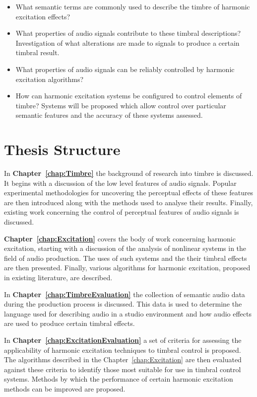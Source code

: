 	\begin{itemize}
		\item What semantic terms are commonly used to describe the timbre of harmonic excitation effects? 
		\item What properties of audio signals contribute to these timbral descriptions? Investigation of what
		      alterations are made to signals to produce a certain timbral result.
		\item What properties of audio signals can be reliably controlled by harmonic excitation algorithms?
		\item How can harmonic excitation systems be configured to control elements of timbre? Systems will be
		      proposed which allow control over particular semantic features and the accuracy of these systems
		      assessed.
	\end{itemize}

\section{Thesis Structure}
\label{sec:Introduction-ThesisStructure}
	In {\bf{Chapter~\ref{chap:Timbre}}} the background of research into timbre is discussed. It begins with a discussion
	of the low level features of audio signals. Popular experimental methodologies for uncovering the perceptual effects
	of these features are then introduced along with the methods used to analyse their results. Finally, existing work
	concerning the control of perceptual features of audio signals is discussed.

	{\bf{Chapter~\ref{chap:Excitation}}} covers the body of work concerning harmonic excitation, starting with a
	discussion of the analysis of nonlinear systems in the field of audio production. The uses of such systems and the
	their timbral effects are then presented. Finally, various algorithms for harmonic excitation, proposed in existing
	literature, are described.

	In {\bf{Chapter~\ref{chap:TimbreEvaluation}}} the collection of semantic audio data during the production process is
	discussed. This data is used to determine the language used for describing audio in a studio environment and how
	audio effects are used to produce certain timbral effects.

	In {\bf{Chapter~\ref{chap:ExcitationEvaluation}}} a set of criteria for assessing the applicability of harmonic
	excitation techniques to timbral control is proposed. The algorithms described in the Chapter~\ref{chap:Excitation}
	are then evaluated against these criteria to identify those most suitable for use in timbral control systems.
	Methods by which the performance of certain harmonic excitation methods can be improved are proposed.

